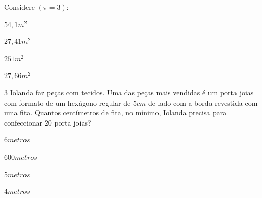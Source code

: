 {{Considere $(\pi = 3)$:

\begin{escolha}
\item $54,1 m^2$
\item $27,41 m^2$
\item $251 m^2$ 
\item $27,66 m^2$
\end{escolha}











\num{3} Iolanda faz peças com tecidos. Uma das peças mais vendidas é um porta
joias com formato de um hexágono regular de $5 cm$ de lado com a borda
revestida com uma fita. Quantos centímetros de fita, no mínimo, Iolanda
precisa para confeccionar $20$ porta joias?

\begin{escolha}
\item $6 metros$ 
\item $600 metros$
\item $5 metros$
\item $4 metros$
\end{escolha}



}}
